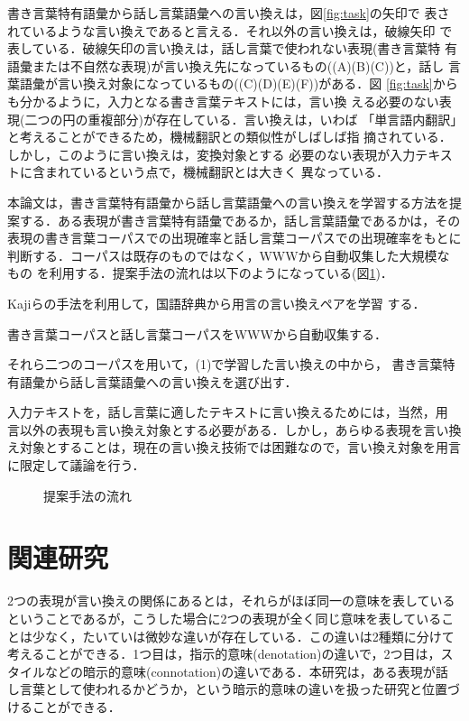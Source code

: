 \documentclass{nlp}
\begin{document}
書き言葉特有語彙から話し言葉語彙への言い換えは，図\ref{fig:task}の矢印で
表されているような言い換えであると言える．それ以外の言い換えは，破線矢印
で表している．破線矢印の言い換えは，話し言葉で使われない表現(書き言葉特
有語彙または不自然な表現)が言い換え先になっているもの((A)(B)(C))と，話し
言葉語彙が言い換え対象になっているもの((C)(D)(E)(F))がある．図
\ref{fig:task}からも分かるように，入力となる書き言葉テキストには，言い換
える必要のない表現(二つの円の重複部分)が存在している．言い換えは，いわば
「単言語内翻訳」と考えることができるため，機械翻訳との類似性がしばしば指
摘されている\cite{Sato99}．しかし，このように言い換えは，変換対象とする
必要のない表現が入力テキストに含まれているという点で，機械翻訳とは大きく
異なっている．

本論文は，書き言葉特有語彙から話し言葉語彙への言い換えを学習する方法を提
案する．ある表現が書き言葉特有語彙であるか，話し言葉語彙であるかは，その
表現の書き言葉コーパスでの出現確率と話し言葉コーパスでの出現確率をもとに
判断する．コーパスは既存のものではなく，WWWから自動収集した大規模なもの
を利用する．提案手法の流れは以下のようになっている(図\ref{fig:outline})．
\begin{list}{}{}
 \item[(1)] Kajiらの手法を利用して，国語辞典から用言の言い換えペアを学習
	    する\cite{Kaji02}．
 \item[(2)] 書き言葉コーパスと話し言葉コーパスをWWWから自動収集する．
 \item[(3)] それら二つのコーパスを用いて，(1)で学習した言い換えの中から，
	    書き言葉特有語彙から話し言葉語彙への言い換えを選び出す．
\end{list}
入力テキストを，話し言葉に適したテキストに言い換えるためには，当然，用
言以外の表現も言い換え対象とする必要がある．しかし，あらゆる表現を言い換
え対象とすることは，現在の言い換え技術では困難なので，言い換え対象を用言
に限定して議論を行う．
\begin{figure}[h]
 \begin{center}
 \end{center}
 \caption{提案手法の流れ}
 \label{fig:outline}
\end{figure}


\section{関連研究}
2つの表現が言い換えの関係にあるとは，それらがほぼ同一の意味を表している
ということであるが，こうした場合に2つの表現が全く同じ意味を表しているこ
とは少なく，たいていは微妙な違いが存在している．この違いは2種類に分けて
考えることができる．1つ目は，指示的意味(denotation)の違いで，2つ目は，ス
タイルなどの暗示的意味(connotation)の違いである．本研究は，ある表現が話
し言葉として使われるかどうか，という暗示的意味の違いを扱った研究と位置づ
けることができる．
\end{document}

